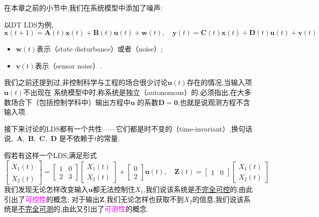 \documentclass[cn,10pt,citestyle=gb7714-2015,bibstyle=gb7714-2015]{elegantbook}
\begin{document}
在本章之前的小节中,我们在系统模型中添加了噪声:
\begin{proposition}\label{pro:LDS with noise}
  以DT LDS为例,
  \[
    \bm{x}(t+1)=\bm{A}(t)\bm{x}(t)+\bm{B}(t)\bm{u}(t)+\bm{w}(t),\quad \bm{y}(t)=\bm{C}(t)\bm{x}(t)+\bm{D}(t)\bm{u}(t)+\bm{v}(t)
  \]
  \begin{itemize}
    \item $\bm{w}(t)$表示（state disturbance）或者（noise）;
    \item $\bm{v}(t)$表示（sensor noise）.
  \end{itemize}
\end{proposition}

我们之前还提到过,非控制科学与工程的场合很少讨论$\bm{u}(t)$存在的情况,当输入项$\bm{u}(t)$不出现在
系统模型中时,称系统是独立（autonomous）的.必须指出,在大多数场合下（包括控制学科中）输出方程中$\bm{u}$
的系数$\bm{D}=\bm{0}$,也就是说观测方程不含输入项.

接下来讨论的LDS都有一个共性——它们都是时不变的（time-invariant）,换句话说,\ $\bm{A}$,\ $\bm{B}$,\ $\bm{C}$,\ $\bm{D}$
是不依赖于$t$的常量.

假若有这样一个LDS,满足形式
\[
    \begin{bmatrix}
      \dot{X}_1(t)\\
      \dot{X}_2(t)
    \end{bmatrix}=
    \begin{bmatrix}
      1&0\\
      2&3
    \end{bmatrix}
    \begin{bmatrix}
      X_1(t)\\
      X_2(t)
    \end{bmatrix}+
    \begin{bmatrix}
      0\\
      2
    \end{bmatrix}\bm{u}(t),\quad\bm{Z}(t)=\begin{bmatrix}
      1&0
    \end{bmatrix}
    \begin{bmatrix}
      X_1(t)\\
      X_2(t)
    \end{bmatrix}
\]
我们发现无论怎样改变输入$\bm{u}$都无法控制住$X_1$,我们说该系统是\uline{不完全可控}的,由此引出了\textcolor{magenta}{可控性}的概念;
对于输出$\bm{Z}$,我们无论怎样也获取不到$X_2$的信息,我们说该系统是\uline{不完全可测}的,由此又引出了\textcolor{magenta}{可测性}的概念.
\end{document}
